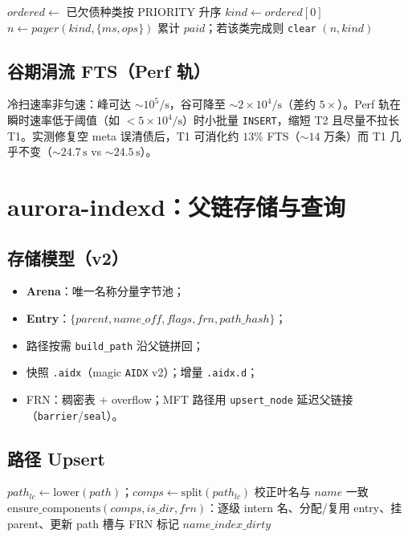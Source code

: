 \documentclass[UTF8,a4paper,11pt]{ctexart}
\begin{document}
\begin{algorithm}[htbp]
\caption{IndexDebt.paySlice$(budget)$}
$ordered \leftarrow$ 已欠债种类按 PRIORITY 升序\;
$kind \leftarrow ordered[0]$\;
$n \leftarrow payer(kind, \{ms,ops\})$\;
累计 $paid$；若该类完成则 \texttt{clear}\;
\Return $(n, kind)$\;
\end{algorithm}

\subsection{谷期涓流 FTS（Perf 轨）}
冷扫速率非匀速：峰可达 $\sim 10^5/\mathrm{s}$，谷可降至 $\sim 2\times 10^4/\mathrm{s}$（差约 $5\times$）。Perf 轨在瞬时速率低于阈值（如 $<5\times 10^4/\mathrm{s}$）时小批量 \texttt{INSERT}，缩短 T2 且尽量不拉长 T1。实测修复空 meta 误清债后，T1 可消化约 $13\%$ FTS（$\sim 14$ 万条）而 T1 几乎不变（$\sim 24.7\,\mathrm{s}$ vs $\sim 24.5\,\mathrm{s}$）。

\section{aurora-indexd：父链存储与查询}
\label{sec:indexd}

\subsection{存储模型（v2）}
\begin{itemize}[leftmargin=1.6em]
  \item \textbf{Arena}：唯一名称分量字节池；
  \item \textbf{Entry}：$\{parent, name\_off, flags, frn, path\_hash\}$；
  \item 路径按需 \texttt{build\_path} 沿父链拼回；
  \item 快照 \texttt{.aidx}（magic \texttt{AIDX} v2）；增量 \texttt{.aidx.d}；
  \item FRN：稠密表 + overflow；MFT 路径用 \texttt{upsert\_node} 延迟父链接（\texttt{barrier}/\texttt{seal}）。
\end{itemize}

\subsection{路径 Upsert}
\begin{algorithm}[htbp]
\caption{indexd.upsert$(path, name, is\_dir, frn)$}
$path_{lc} \leftarrow \mathrm{lower}(path)$；$comps \leftarrow \mathrm{split}(path_{lc})$\;
校正叶名与 $name$ 一致\;
$\mathrm{ensure\_components}(comps, is\_dir, frn)$：逐级 intern 名、分配/复用 entry、挂 parent、更新 path 槽与 FRN\;
标记 $name\_index\_dirty$\;
\end{algorithm}
\end{document}
